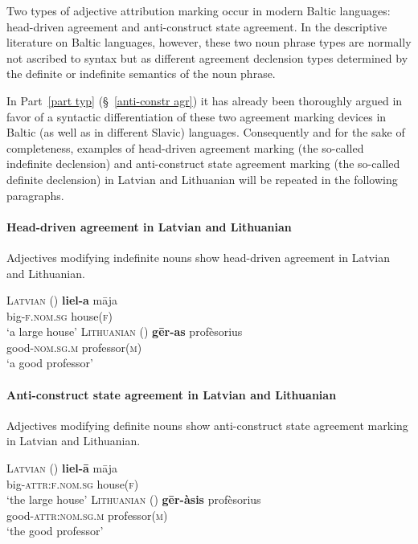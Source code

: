 Two types of adjective attribution marking occur in modern Baltic languages: head-driven agreement and anti-construct state agreement. In the descriptive literature on Baltic languages, however, these two noun phrase types are normally not ascribed to syntax but as different agreement declension types determined by the definite or indefinite semantics of the noun phrase.

In Part~\ref{part typ} (\S~\ref{anti-constr agr}) it has already been thoroughly argued in favor of a syntactic differentiation of these two agreement marking devices in Baltic (as well as in different Slavic) languages. Consequently and for the sake of completeness, examples of head-driven agreement marking (the so-called indefinite declension) and anti-construct state agreement marking (the so-called definite declension) in Latvian and Lithuanian will be repeated in the following paragraphs.

\paragraph{Head-driven agreement in Latvian and Lithuanian} 
Adjectives modifying indefinite nouns show head-driven agreement in Latvian and Lithuanian.
\begin{exe}
\ex 
\begin{xlist}
\ex	\textsc{Latvian} (\citealt[115]{dahl2007})
\gll 	\textbf{liel-a} māja\\
	big-\textsc{f.nom.sg} house(\textsc{f})\\
\glt	‘a large house’
\ex \textsc{Lithuanian} (\citealt[13]{bechert1993})
\gll 	\textbf{gēr-as}			profèsorius\\
	good-\textsc{nom.sg.m} professor(\textsc{m})\\
\glt	‘a good professor’
\end{xlist}
\end{exe}

\paragraph{Anti-construct state agreement in Latvian and Lithuanian}
Adjectives modifying definite nouns show anti-construct state agreement marking in Latvian and Lithuanian.
\begin{exe}
\ex 
\begin{xlist}	
\ex	\textsc{Latvian} (\citealt[115]{dahl2007})
\gll 	\textbf{liel-ā} māja\\
	big-\textsc{attr:f.nom.sg} house(\textsc{f})\\
\glt	‘the large house’
\ex \textsc{Lithuanian} (\citealt[13]{bechert1993})
\gll 	\textbf{gēr-àsis}		profèsorius\\
	good-\textsc{attr:nom.sg.m}	professor(\textsc{m})\\
\glt	‘the good professor’
\end{xlist}
\end{exe}

